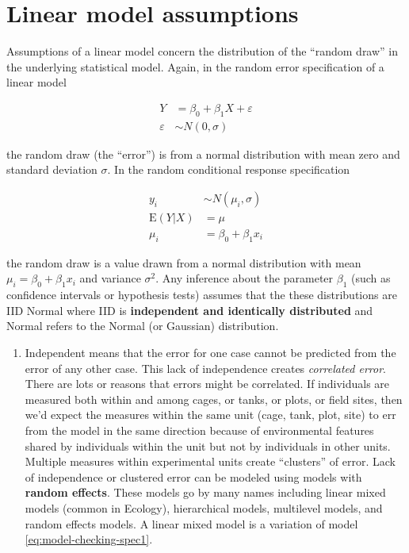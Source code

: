 \documentclass[]{book}
\providecommand{\tightlist}{%
  \setlength{\itemsep}{0pt}\setlength{\parskip}{0pt}}
\begin{document}
\hypertarget{linear-model-assumptions}{%
\section{Linear model assumptions}\label{linear-model-assumptions}}

Assumptions of a linear model concern the distribution of the ``random draw'' in the underlying statistical model. Again, in the random error specification of a linear model

\begin{align}
Y &= \beta_0 + \beta_1 X + \varepsilon\\
\varepsilon &\sim N(0, \sigma)
\label{eq:model-checking-spec1}
\end{align}

the random draw (the ``error'') is from a normal distribution with mean zero and standard deviation \(\sigma\). In the random conditional response specification

\begin{align}
y_i &\sim N(\mu_i, \sigma)\\
\mathrm{E}(Y|X) &= \mu\\
\mu_i &= \beta_0 + \beta_1 x_i
\label{eq:model-checking-spec2}
\end{align}

the random draw is a value drawn from a normal distribution with mean \(\mu_i = \beta_0 + \beta_1 x_i\) and variance \(\sigma^2\). Any inference about the parameter \(\beta_1\) (such as confidence intervals or hypothesis tests) assumes that the these distributions are IID Normal where IID is \textbf{independent and identically distributed} and Normal refers to the Normal (or Gaussian) distribution.

\begin{enumerate}
\def\labelenumi{\arabic{enumi}.}
\tightlist
\item
  Independent means that the error for one case cannot be predicted from the error of any other case. This lack of independence creates \emph{correlated error}. There are lots or reasons that errors might be correlated. If individuals are measured both within and among cages, or tanks, or plots, or field sites, then we'd expect the measures within the same unit (cage, tank, plot, site) to err from the model in the same direction because of environmental features shared by individuals within the unit but not by individuals in other units. Multiple measures within experimental units create ``clusters'' of error. Lack of independence or clustered error can be modeled using models with \textbf{random effects}. These models go by many names including linear mixed models (common in Ecology), hierarchical models, multilevel models, and random effects models. A linear mixed model is a variation of model \eqref{eq:model-checking-spec1}.
\end{enumerate}
\end{document}

